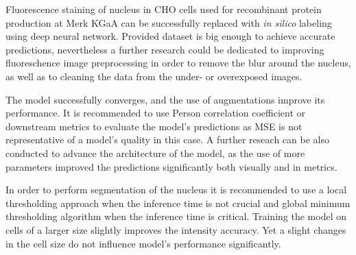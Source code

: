 Fluorescence staining of nucleus in CHO cells used for recombinant protein production at Merk KGaA can be successfully replaced with \textit{in silico} labeling using deep neural network. Provided dataset is big enough to achieve accurate predictions, nevertheless a further research could be dedicated to improving fluoreschence image preprocessing in order to remove the blur around the nucleus, as well as to cleaning the data from the under- or overexposed images. 

The model successfully converges, and the use of augmentations improve its performance. It is recommended to use Person correlation coefficient or downstream metrics to evaluate the model's predictions as MSE is not representative of a model's quality in this case. A further reseach can be also conducted to advance the architecture of the model, as the use of more parameters improved the predictions significantly both visually and in metrics. 

In order to perform segmentation of the nucleus it is recommended to use a local thresholding approach when the inference time is not crucial and global minimum thresholding algorithm when the inference time is critical. Training the model on cells of a larger size slightly improves the intensity accuracy. Yet a slight changes in the cell size do not influence model's performance significantly.